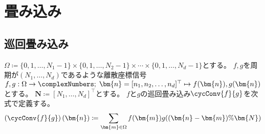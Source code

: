 \part{畳み込み}
	\chapter{巡回畳み込み}
		\label{巡回畳み込み}
		$\Omega \coloneqq \{0,1,\dots,N_1-1\}\times\{0,1,\dots,N_2-1\}\times\cdots\times\{0,1,\dots,N_d-1\}$とする。
		$f,g$を周期が$(N_1,\dots,N_d)$であるような離散座標信号$f,g: \Omega\to\complexNumbers;\;\bm{n} = [n_1,n_2,\dots,n_d]^\top \mapsto f(\bm{n}),g(\bm{n})$とする。
		$\bm{N} \coloneqq [N_1,\dots,N_d]^\top$とする。
		$f$と$g$の巡回畳み込み$\cycConv{f}{g}$を次式で定義する。
		\[ \left(\cycConv{f}{g}\right)(\bm{n}) \coloneqq \sum_{\bm{m} \in\Omega} f(\bm{m})g((\bm{n}-\bm{m})\%\bm{N}) \]

